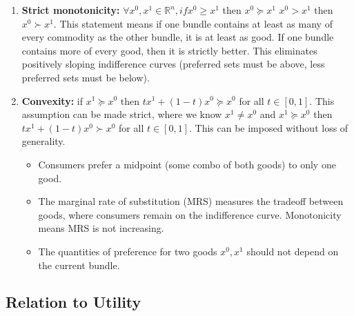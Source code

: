 \documentclass{article}
\begin{document}
\begin{itemize}
\begin{enumerate}
        \item \textbf{Strict monotonicity:} $\forall x^0, x^1 \in \mathbb{R}^n, if x^0 \geq x^1$ then $x^0 \succeq x^1$  $x^0 > x^1$ then $x^0 \succ x^1$. This statement means if one bundle contains at least as many of every commodity as the other bundle, it is at least as good. If one bundle contains more of every good, then it is strictly better. This eliminates positively sloping indifference curves (preferred sets must be above, less preferred sets must be below).
        \item \textbf{Convexity:} if $x^1 \succeq x^0$ then $tx^1 + (1-t)x^0 \succeq x^0$ for all $t \in [0,1]$. This assumption can be made strict, where we know $x^1 \neq x^0$ and $x^1 \succeq x^0$ then $tx^1 + (1-t)x^0 \succ x^0$ for all $t \in [0,1]$. This can be imposed without loss of generality. 
        \begin{itemize}
            \item Consumers prefer a midpoint (some combo of both goods) to only one good. 
            \item The marginal rate of substitution (MRS) measures the tradeoff between goods, where consumers remain on the indifference curve. Monotonicity means MRS is not increasing. 
            \item The quantities of preference for two goods $x^0, x^1$ should not depend on the current bundle. 
        \end{itemize}

    \end{enumerate}
\end{itemize}

\subsection{Relation to Utility}
\end{document}
